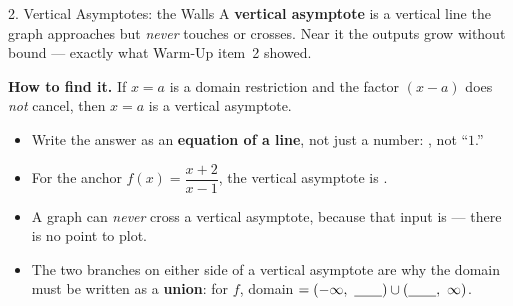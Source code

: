 \documentclass[10pt]{article}
\begin{document}
\begin{notesbox}{2. Vertical Asymptotes: the Walls}
A \textbf{vertical asymptote} is a vertical line the graph approaches but \emph{never} touches or
crosses. Near it the outputs grow without bound --- exactly what Warm-Up item~2 showed.

\vspace{3pt}
\textbf{How to find it.} If $x=a$ is a domain restriction and the factor $(x-a)$ does \emph{not}
cancel, then $x=a$ is a vertical asymptote.
\begin{itemize}[leftmargin=1.5em, itemsep=3pt]
  \item Write the answer as an \textbf{equation of a line}, not just a number:
        \blank{1.8cm}, not ``$1$.''
  \item For the anchor $f(x)=\dfrac{x+2}{x-1}$, the vertical asymptote is \blank{2.0cm}.
  \item A graph can \emph{never} cross a vertical asymptote, because that input is
        \blank{4.4cm} --- there is no point to plot.
  \item The two branches on either side of a vertical asymptote are why the domain must be written
        as a \textbf{union}: for $f$, domain $=(-\infty,\ \blank{0.7cm}) \cup (\blank{0.7cm},\ \infty)$.
\end{itemize}
\end{notesbox}
\end{document}
